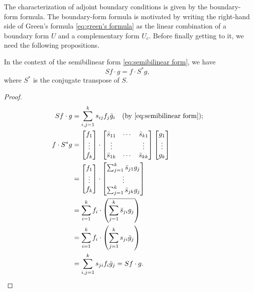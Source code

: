 \documentclass[11pt, oneside, a4paper]{article}
\begin{document}
The characterization of adjoint boundary conditions is given by the boundary-form formula. The boundary-form formula is motivated by writing the right-hand side of Green's formula \eqref{eq:green's formula} as the linear combination of a boundary form $U$ and a complementary form $U_c$. Before finally getting to it, we need the following propositions.

\begin{prop}
    In the context of the semibilinear form \eqref{eq:semibilinear form}, we have
    \begin{equation}\label{eq:semibilinear adjoint}
        Sf\cdot g = f\cdot S^*g, 
    \end{equation}
    where $S^*$ is the conjugate transpose of $S$.
\end{prop}
\begin{proof}
    \begin{align*}
        Sf\cdot g &= \sum_{i,j=1}^k s_{ij}f_j\bar{g}_i \quad\mbox{(by \eqref{eq:semibilinear form})};\\
        f\cdot S^*g &= \begin{bmatrix}
            f_1\\
            \vdots\\
            f_k
        \end{bmatrix}\cdot \begin{bmatrix}
            \bar{s}_{11} & \cdots & \bar{s}_{k1}\\
            \vdots & & \vdots\\
            \bar{s}_{1k} & \cdots & \bar{s}_{kk}
        \end{bmatrix} \begin{bmatrix}
            g_1\\
            \vdots\\
            g_k
        \end{bmatrix}\\
        &= \begin{bmatrix}
            f_1\\
            \vdots\\
            f_k
        \end{bmatrix}\cdot \begin{bmatrix}
            \sum_{j=1}^k \bar{s}_{j1}g_j\\
            \vdots\\
            \sum_{j=1}^k \bar{s}_{jk}g_j
        \end{bmatrix}\\
        &= \sum_{i=1}^k f_i\cdot \left(\overline{\sum_{j=1}^k\bar{s}_{ji}g_j}\right)\\
        &= \sum_{i=1}^k f_i\cdot \left(\sum_{j=1}^k s_{ji}\bar{g}_j\right)\\
        &= \sum_{i,j=1}^k s_{ji}f_i\bar{g}_j = Sf\cdot g.\qedhere
    \end{align*}
\end{proof}
\end{document}
